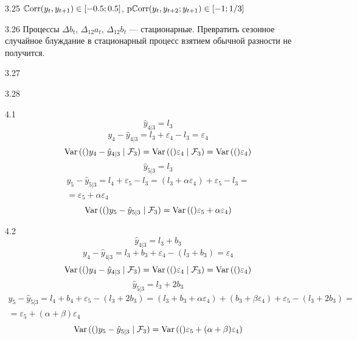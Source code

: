 \protect \hypertarget {soln:3.25}{}
\begin{solution}{{3.25}}
    $\operatorname{\mathbb{C}\mathrm{orr}}(y_t, y_{t+1}) \in [-0.5; 0.5]$, $\operatorname{\mathrm{p}\mathbb{C}\mathrm{orr}}(y_t, y_{t+2} ; y_{t+1}) \in [-1; 1/3]$
  
\end{solution}
\protect \hypertarget {soln:3.26}{}
\begin{solution}{{3.26}}
    Процессы $\Delta b_t$, $\Delta_{12} a_t$, $\Delta_{12} b_t$ — стационарные.
    Превратить сезонное случайное блуждание в стационарный процесс взятием обычной разности не получится.
  
\end{solution}
\protect \hypertarget {soln:3.27}{}
\begin{solution}{{3.27}}
  
\end{solution}
\protect \hypertarget {soln:3.28}{}
\begin{solution}{{3.28}}
  
\end{solution}
\protect \hypertarget {soln:4.1}{}
\begin{solution}{{4.1}}
  \[
    \hat y_{4|3} = l_3
  \]
  \[
    y_4 - \hat y_{4|3} = l_3 + \varepsilon_4 - l_3 = \varepsilon_4
  \]
  \[
  \operatorname{Var}{\left((\right)}y_4 - \hat y_{4|3} \mid \mathcal{F}_3) = \operatorname{Var}{\left((\right)}\varepsilon_4 \mid \mathcal{F}_3) = \operatorname{Var}{\left((\right)}\varepsilon_4)
  \]
  \[
  \hat y_{5|3} = l_3
  \]
  \begin{multline}
  y_5 - \hat y_{5|3} = l_4  + \varepsilon_5 - l_3  = (l_3 + \alpha \varepsilon_4)  +
   \varepsilon_5 - l_3 = \\
  = \varepsilon_5 + \alpha  \varepsilon_4
  \end{multline}
  \[
  \operatorname{Var}{\left((\right)}y_5 - \hat y_{5|3} \mid \mathcal{F}_3) = \operatorname{Var}{\left((\right)}\varepsilon_5 + \alpha  \varepsilon_4 )
  \]

\end{solution}
\protect \hypertarget {soln:4.2}{}
\begin{solution}{{4.2}}
\[
\hat y_{4|3} = l_3 + b_3
\]
\[
y_4 - \hat y_{4|3} = l_3 + b_3 + \varepsilon_4 - (l_3 + b_3) = \varepsilon_4
\]
\[
\operatorname{Var}{\left((\right)}y_4 - \hat y_{4|3} \mid \mathcal{F}_3) = \operatorname{Var}{\left((\right)}\varepsilon_4 \mid \mathcal{F}_3) = \operatorname{Var}{\left((\right)}\varepsilon_4)
\]
\[
\hat y_{5|3} = l_3 + 2b_3
\]
\begin{multline}
y_5 - \hat y_{5|3} = l_4 + b_4 + \varepsilon_5 - (l_3 + 2b_3) = (l_3 + b_3 + \alpha \varepsilon_4)  +
(b_3 + \beta \varepsilon_4) + \varepsilon_5 - (l_3 + 2b_3) = \\
= \varepsilon_5 + (\alpha + \beta) \varepsilon_4
\end{multline}
\[
\operatorname{Var}{\left((\right)}y_5 - \hat y_{5|3} \mid \mathcal{F}_3) = \operatorname{Var}{\left((\right)}\varepsilon_5 + (\alpha + \beta) \varepsilon_4 )
\]
\end{solution}
